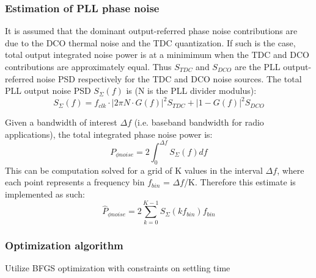 \subsubsection{Estimation of PLL phase noise}
It is assumed that the dominant output-referred phase noise contributions are due to the DCO thermal noise and the TDC quantization. If such is the case, total output integrated noise power is at a minimimum when the TDC and DCO contributions are approximately equal. Thus $S_{TDC}$ and $S_{DCO}$ are the PLL output-referred noise PSD respectively for the TDC and DCO noise sources. The total PLL output noise PSD $S_{\Sigma}(f)$ is (N is the PLL divider modulus):
\begin{equation}
S_{\Sigma}(f) = f_{clk}\cdot|2\pi N\cdot G(f)|^2S_{TDC} + |1-G(f)|^2S_{DCO}
\end{equation}

Given a bandwidth of interest $\Delta f$ (i.e. baseband bandwidth for radio applications), the total integrated phase noise power is:
\begin{equation}
P_{\phi noise} = 2\int_0^{\Delta f} S_{\Sigma}(f)df
\end{equation}
This can be computation solved for a grid of K values in the interval $\Delta f$, where each point represents a frequency bin $f_{bin}$ = $\Delta f$/K. Therefore this estimate is implemented as such:
\begin{equation}
\hat{P}_{\phi noise} = 2\sum_{k=0}^{K-1} S_{\Sigma}(kf_{bin})f_{bin}
\end{equation}

\subsubsection{Optimization algorithm}
Utilize BFGS optimization with constraints on settling time
